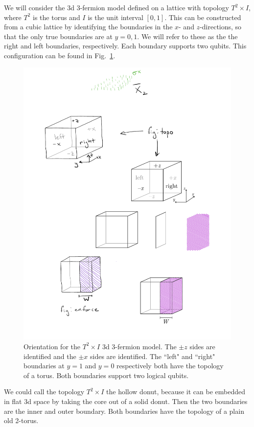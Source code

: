 \documentclass[twocolumn, longbibliography]{revtex4-2}
\begin{document}
We will consider the 3d 3-fermion model defined on a lattice with topology $T^2\times I$, where $T^2$ is the torus and $I$ is the unit interval $[0,1]$. This can be constructed from a cubic lattice by identifying the boundaries in the $x$- and $z$-directions, so that the only true boundaries are at $y=0,1$. We will refer to these as the the right and left boundaries, respectively. Each boundary supports two qubits. This configuration can be found in Fig.~\ref{fig:topo}.

\begin{figure}
\centering
\includegraphics{topo}
\caption{Orientation for the $T^2\times I$ 3d 3-fermion model. The $\pm z$ sides are identified and the $\pm x$ sides are identified. The ``left" and ``right" boundaries at $y=1$ and $y=0$ respectively both have the topology of a torus. Both boundaries support two logical qubits.}
\label{fig:topo}
\end{figure}

We could call the topology $T^2\times I$ the hollow donut, because it can be embedded in flat 3d space by taking the core out of a solid donut. Then the two boundaries are the inner and outer boundary. Both boundaries have the topology of a plain old 2-torus.
\end{document}
